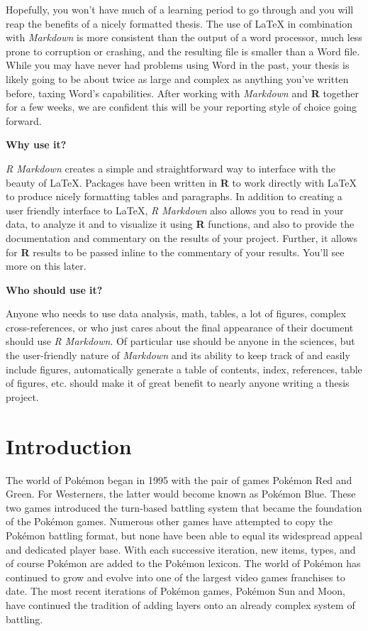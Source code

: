 \documentclass[12pt,twoside]{reedthesis}
\begin{document}
  Hopefully, you won't have much of a learning period to go through and
  you will reap the benefits of a nicely formatted thesis. The use of
  LaTeX in combination with \emph{Markdown} is more consistent than the
  output of a word processor, much less prone to corruption or crashing,
  and the resulting file is smaller than a Word file. While you may have
  never had problems using Word in the past, your thesis is likely going
  to be about twice as large and complex as anything you've written
  before, taxing Word's capabilities. After working with \emph{Markdown}
  and \textbf{R} together for a few weeks, we are confident this will be
  your reporting style of choice going forward.
  
  \textbf{Why use it?}
  
  \emph{R Markdown} creates a simple and straightforward way to interface
  with the beauty of LaTeX. Packages have been written in \textbf{R} to
  work directly with LaTeX to produce nicely formatting tables and
  paragraphs. In addition to creating a user friendly interface to LaTeX,
  \emph{R Markdown} also allows you to read in your data, to analyze it
  and to visualize it using \textbf{R} functions, and also to provide the
  documentation and commentary on the results of your project. Further, it
  allows for \textbf{R} results to be passed inline to the commentary of
  your results. You'll see more on this later.
  
  \textbf{Who should use it?}
  
  Anyone who needs to use data analysis, math, tables, a lot of figures,
  complex cross-references, or who just cares about the final appearance
  of their document should use \emph{R Markdown}. Of particular use should
  be anyone in the sciences, but the user-friendly nature of
  \emph{Markdown} and its ability to keep track of and easily include
  figures, automatically generate a table of contents, index, references,
  table of figures, etc. should make it of great benefit to nearly anyone
  writing a thesis project.
  
  \chapter{Introduction}\label{introduction-1}
  
  The world of Pokémon began in 1995 with the pair of games Pokémon Red
  and Green. For Westerners, the latter would become known as Pokémon
  Blue. These two games introduced the turn-based battling system that
  became the foundation of the Pokémon games. Numerous other games have
  attempted to copy the Pokémon battling format, but none have been able
  to equal its widespread appeal and dedicated player base. With each
  successive iteration, new items, types, and of course Pokémon are added
  to the Pokémon lexicon. The world of Pokémon has continued to grow and
  evolve into one of the largest video games franchises to date. The most
  recent iterations of Pokémon games, Pokémon Sun and Moon, have continued
  the tradition of adding layers onto an already complex system of
  battling.
  
\end{document}
